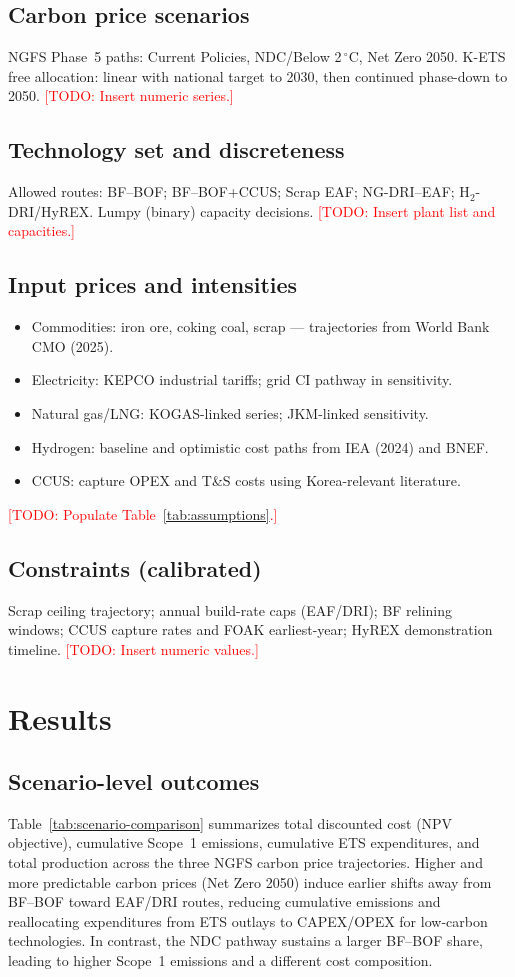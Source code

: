 \documentclass[preprint,5p,authoryear]{elsarticle}
\newcommand{\todo}[1]{\textcolor{red}{[TODO: #1]}}
\begin{document}
\subsection{Carbon price scenarios}
NGFS Phase~5 paths: Current Policies, NDC/Below 2\,$^\circ$C, Net Zero 2050. K-ETS free allocation: linear with national target to 2030, then continued phase-down to 2050. \todo{Insert numeric series.}

\subsection{Technology set and discreteness}
Allowed routes: BF--BOF; BF--BOF+CCUS; Scrap EAF; NG-DRI--EAF; H$_2$-DRI/HyREX. Lumpy (binary) capacity decisions. \todo{Insert plant list and capacities.}

\subsection{Input prices and intensities}
\begin{itemize}[leftmargin=*]
  \item Commodities: iron ore, coking coal, scrap --- trajectories from World Bank CMO (2025).
  \item Electricity: KEPCO industrial tariffs; grid CI pathway in sensitivity.
  \item Natural gas/LNG: KOGAS-linked series; JKM-linked sensitivity.
  \item Hydrogen: baseline and optimistic cost paths from IEA (2024) and BNEF.
  \item CCUS: capture OPEX and T\&S costs using Korea-relevant literature.
\end{itemize}
\todo{Populate Table~\ref{tab:assumptions}.}

\subsection{Constraints (calibrated)}
Scrap ceiling trajectory; annual build-rate caps (EAF/DRI); BF relining windows; CCUS capture rates and FOAK earliest-year; HyREX demonstration timeline. \todo{Insert numeric values.}

\section{Results}

\subsection{Scenario-level outcomes}
Table~\ref{tab:scenario-comparison} summarizes total discounted cost (NPV objective), cumulative Scope~1 emissions, cumulative ETS expenditures, and total production across the three NGFS carbon price trajectories. Higher and more predictable carbon prices (Net Zero 2050) induce earlier shifts away from BF--BOF toward EAF/DRI routes, reducing cumulative emissions and reallocating expenditures from ETS outlays to CAPEX/OPEX for low-carbon technologies. In contrast, the NDC pathway sustains a larger BF--BOF share, leading to higher Scope~1 emissions and a different cost composition.
\end{document}
